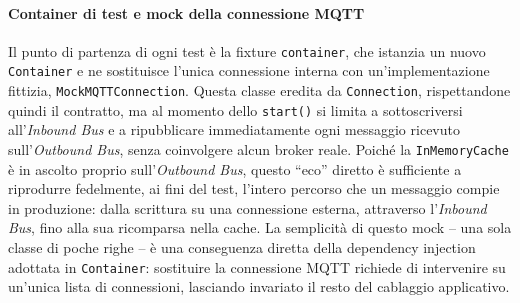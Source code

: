 \paragraph{Container di test e mock della connessione MQTT}
Il punto di partenza di ogni test è la fixture \texttt{container}, che istanzia un nuovo \texttt{Container} e ne sostituisce l'unica connessione interna con un'implementazione fittizia, \texttt{MockMQTTConnection}. Questa classe eredita da \texttt{Connection}, rispettandone quindi il contratto, ma al momento dello \texttt{start()} si limita a sottoscriversi all'\textit{Inbound Bus} e a ripubblicare immediatamente ogni messaggio ricevuto sull'\textit{Outbound Bus}, senza coinvolgere alcun broker reale. Poiché la \texttt{InMemoryCache} è in ascolto proprio sull'\textit{Outbound Bus}, questo ``eco'' diretto è sufficiente a riprodurre fedelmente, ai fini del test, l'intero percorso che un messaggio compie in produzione: dalla scrittura su una connessione esterna, attraverso l'\textit{Inbound Bus}, fino alla sua ricomparsa nella cache. La semplicità di questo mock -- una sola classe di poche righe -- è una conseguenza diretta della dependency injection adottata in \texttt{Container}: sostituire la connessione \ac{MQTT} richiede di intervenire su un'unica lista di connessioni, lasciando invariato il resto del cablaggio applicativo.

